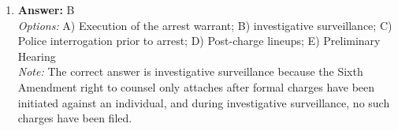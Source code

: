 \documentclass[12pt]{article}
\begin{document}
\begin{enumerate}[label=\arabic*.]
\\ \textit{Note:} Separating punishment from its justification is crucial because a value-neutral definition ensures that the concept can be analyzed and applied consistently within constitutional law, avoiding biases that may arise from moral or ethical considerations.
\item \textbf{Answer:} B
\\ \textit{Options:} A) Execution of the arrest warrant; B) investigative surveillance; C) Police interrogation prior to arrest; D) Post-charge lineups; E) Preliminary Hearing
\\ \textit{Note:} The correct answer is investigative surveillance because the Sixth Amendment right to counsel only attaches after formal charges have been initiated against an individual, and during investigative surveillance, no such charges have been filed.
\end{enumerate}
\end{document}
